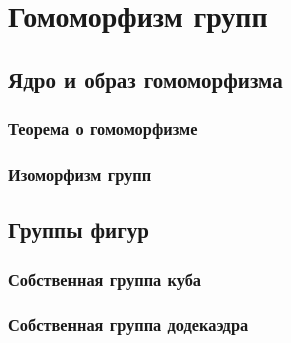 \section{Гомоморфизм групп}
\subsection{Ядро и образ гомоморфизма}

\subsubsection{Теорема о гомоморфизме}
\subsubsection{Изоморфизм групп}

\subsection{Группы фигур}
\subsubsection{Собственная группа куба}
\subsubsection{Собственная группа додекаэдра}

